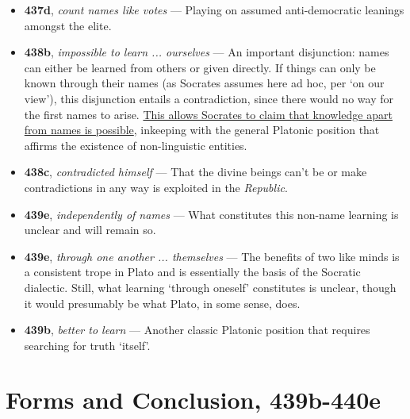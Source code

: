 \documentclass[12pt]{article}
\begin{document}
\begin{itemize}
\item \textbf{437d}, \textit{count names like votes} --- Playing on assumed anti-democratic leanings amongst the elite.

\item \textbf{438b}, \textit{impossible to learn ... ourselves} --- An important disjunction: names can either be learned from others or given directly. If things can only be known through their names (as Socrates assumes here ad hoc, per `on our view'), this disjunction entails a contradiction, since there would no way for the first names to arise. \ul{This allows Socrates to claim that knowledge apart from names is possible}, inkeeping with the general Platonic position that affirms the existence of non-linguistic entities.

\item \textbf{438c}, \textit{contradicted himself} --- That the divine beings can't be or make contradictions in any way is exploited in the \textit{Republic}.

\item \textbf{439e}, \textit{independently of names} --- What constitutes this non-name learning is unclear and will remain so.

\item \textbf{439e}, \textit{through one another ... themselves} --- The benefits of two like minds is a consistent trope in Plato and is essentially the basis of the Socratic dialectic. Still, what learning `through oneself' constitutes is unclear, though it would presumably be what Plato, in some sense, does.

\item \textbf{439b}, \textit{better to learn} --- Another classic Platonic position that requires searching for truth `itself'.

\end{itemize}

\section{Forms and Conclusion, 439b-440e}
\end{document}
